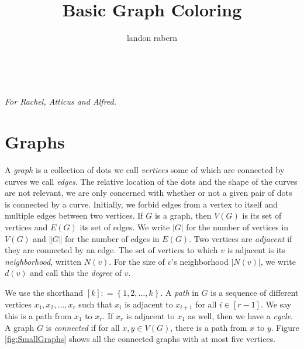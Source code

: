 \documentclass[openany]{tufte-book} %
\title{Basic Graph Coloring}
\author{landon rabern}
\theoremstyle{plain}
\newcommand{\set}[1]{\left\{ #1 \right\}}
\newcommand{\card}[1]{\left|#1\right|}
\newcommand{\size}[1]{\left\Vert#1\right\Vert}
\newcommand{\irange}[1]{\left[#1\right]}
\newcommand{\DefinedAs}{\mathrel{\mathop:}=}
\begin{document}
\frontmatter
\maketitle 


\tableofcontents


\cleardoublepage
~\vfill
\begin{doublespace}
\noindent\fontsize{18}{22}\selectfont\itshape
\nohyphenation
For Rachel, Atticus and Alfred.
\end{doublespace}
\vfill
\vfill

\cleardoublepage
\mainmatter
\chapter{Graphs}
A \emph{graph} is a collection of dots we call \emph{vertices} some of which are connected by curves we call \emph{edges}. 
The relative location of the dots and the shape of the curves are not relevant, we are only concerned with whether or not a given
pair of dots is connected by a curve.  Initially, we forbid edges from a vertex to itself and multiple edges between two vertices.
If $G$ is a graph, then $V(G)$ is its set of vertices and $E(G)$ its set of edges. 
We write $\card{G}$ for the number of vertices in $V(G)$ and $\size{G}$ for the number of edges in $E(G)$.
Two vertices
are \emph{adjacent}  if they are connected by an edge.  The set
of vertices to which $v$ is adjacent is its \emph{neighborhood}, written $N(v)$. 
For the size of $v$'s neighborhood $\card{N(v)}$, we write $d(v)$ and call this the \emph{degree} of $v$.

We use the shorthand $\irange{k} \DefinedAs \set{1,2,\ldots, k}$. A \emph{path} in $G$ is a sequence of different vertices $x_1, x_2, \ldots, x_r$ such that $x_i$ is adjacent to $x_{i+1}$ for all $i \in \irange{r-1}$.  We say
this is a path from $x_1$ to $x_r$.
If $x_r$ is adjacent to $x_1$ as well, then we have a \emph{cycle}.  A graph $G$ is \emph{connected} if for all $x,y \in V(G)$, there is a path from $x$ to $y$.
Figure \ref{fig:SmallGraphs} shows all the connected graphs with at most five vertices.
\end{document}
